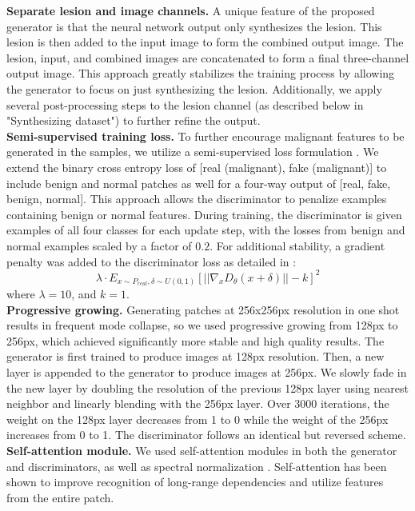 \documentclass{article}
\begin{document}
\noindent\textbf{Separate lesion and image channels.}
A unique feature of the proposed generator is that the neural network output only synthesizes the lesion. This lesion is then added to the input image to form the combined output image. The lesion, input, and combined images are concatenated to form a final three-channel output image. This approach greatly stabilizes the training process by allowing the generator to focus on just synthesizing the lesion.
Additionally, we apply several post-processing steps to the lesion channel (as described below in "Synthesizing dataset") to further refine the output. \\

\noindent\textbf{Semi-supervised training loss.}
To further encourage malignant features to be generated in the samples, we utilize a semi-supervised loss formulation \cite{ssgan}. We extend the binary cross entropy loss of [real (malignant), fake (malignant)] to include benign and normal patches as well for a four-way output of [real, fake, benign, normal]. This approach allows the discriminator to penalize examples containing benign or normal features. During training, the discriminator is given examples of all four classes for each update step, with the losses from benign and normal examples scaled by a factor of $0.2$. For additional stability, a gradient penalty was added to the discriminator loss as detailed in \cite{dragan}:
$$
\lambda \cdot E_{x\sim P_{real},\delta\sim U(0, 1)} \left[ || \nabla_{x} D_{\theta}(x+\delta)||-k\right]^2
$$
where $\lambda=10$, and $k=1$. \\

\noindent\textbf{Progressive growing.}
Generating patches at 256x256px resolution in one shot results in frequent mode collapse, so we used progressive growing \cite{pggan} from 128px to 256px, which achieved significantly more stable and high quality results. The generator is first trained to produce images at 128px resolution. Then, a new layer is appended to the generator to produce images at 256px. We slowly fade in the new layer by doubling the resolution of the previous 128px layer using nearest neighbor and linearly blending with the 256px layer. Over 3000 iterations, the weight on the 128px layer decreases from 1 to 0 while the weight of the 256px increases from 0 to 1. The discriminator follows an identical but reversed scheme. \\

\noindent\textbf{Self-attention module.}
We used self-attention \cite{sagan} modules in both the generator and discriminators, as well as spectral normalization \cite{spectral}. Self-attention has been shown \cite{sagan} to improve recognition of long-range dependencies and utilize features from the entire patch. \\
\end{document}
